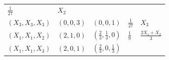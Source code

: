 \documentclass[]{book}
\theoremstyle{definition}
\theoremstyle{definition}
\theoremstyle{definition}
\theoremstyle{remark}
\begin{document}
\begin{longtable}[]{@{}lllll@{}}
\begin{minipage}[t]{0.17\columnwidth}
\(\frac{1}{27}\)\strut
\end{minipage} & \begin{minipage}[t]{0.18\columnwidth}\raggedright\strut
\(X_2\)\strut
\end{minipage}\tabularnewline
\begin{minipage}[t]{0.18\columnwidth}\raggedright\strut
\(\left( X_3,X_3,X_3 \right)\)\strut
\end{minipage} & \begin{minipage}[t]{0.16\columnwidth}\raggedright\strut
\(\left( 0,0,3 \right)\)\strut
\end{minipage} & \begin{minipage}[t]{0.16\columnwidth}\raggedright\strut
\(\left(0,0,1 \right)\)\strut
\end{minipage} & \begin{minipage}[t]{0.17\columnwidth}\raggedright\strut
\(\frac{1}{27}\)\strut
\end{minipage} & \begin{minipage}[t]{0.18\columnwidth}\raggedright\strut
\(X_3\)\strut
\end{minipage}\tabularnewline
\begin{minipage}[t]{0.18\columnwidth}\raggedright\strut
\(\left( X_1,X_1,X_2 \right)\)\strut
\end{minipage} & \begin{minipage}[t]{0.16\columnwidth}\raggedright\strut
\(\left( 2,1,0 \right)\)\strut
\end{minipage} & \begin{minipage}[t]{0.16\columnwidth}\raggedright\strut
\(\left( \frac{2}{3},\frac{1}{3},0 \right)\)\strut
\end{minipage} & \begin{minipage}[t]{0.17\columnwidth}\raggedright\strut
\(\frac{1}{9}\)\strut
\end{minipage} & \begin{minipage}[t]{0.18\columnwidth}\raggedright\strut
\(\frac{2X_1+X_2}{3}\)\strut
\end{minipage}\tabularnewline
\begin{minipage}[t]{0.18\columnwidth}\raggedright\strut
\(\left( X_1,X_1,X_3 \right)\)\strut
\end{minipage} & \begin{minipage}[t]{0.16\columnwidth}\raggedright\strut
\(\left( 2,0,1 \right)\)\strut
\end{minipage} & \begin{minipage}[t]{0.16\columnwidth}\raggedright\strut
\(\left( \frac{2}{3},0,\frac{1}{3} \right)\)\strut

\end{minipage}
\end{longtable}
\end{document}

